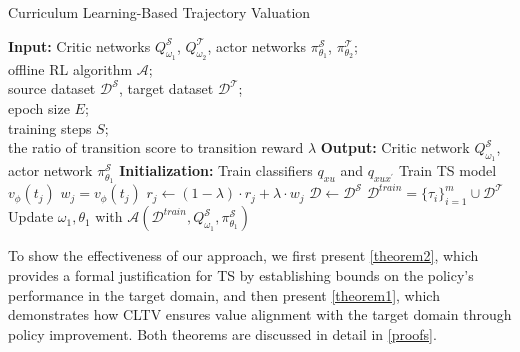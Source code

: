 \begin{algorithm}[!ht]
\caption{Curriculum Learning-Based Trajectory Valuation}
\label{alg:cltv}
\begin{algorithmic}[1]
\State \textbf{Input:} Critic networks $Q_{\omega_1}^{\mathcal{S}}$, $Q_{\omega_2}^{\mathcal{T}}$, actor networks $\pi_{\theta_1}^{\mathcal{S}}$, $\pi_{\theta_2}^{\mathcal{T}}$; \\offline RL algorithm $\mathcal{A}$; \\source dataset $\mathcal{D^S}$, target dataset $\mathcal{D^T}$; \\epoch size $E$; \\training steps $S$; \\the ratio of transition score to transition reward $\lambda$
\State \textbf{Output:} Critic network $Q_{\omega_1}^{\mathcal{S}}$, actor network $\pi_{\theta_1}^{\mathcal{S}}$
\State \textbf{Initialization:}
\State Train classifiers $q_{xu}$ and $q_{xu{x}^{\prime}}$
\State Train TS model $v_{\phi}(t_j)$
    \State $w_j = v_{\phi}(t_j)$
    \State $r_j \leftarrow (1 - \lambda) \cdot r_j + \lambda \cdot w_j$
\EndFor
{}
    \State $\mathcal{D} \leftarrow \mathcal{D^S}$
        \State {}
    \EndFor
        \State $\mathcal{D}^{train} = \{\tau_i\}_{i=1}^m \cup \mathcal{D}^{\mathcal{T}}$
        \State Update $\omega_1, \theta_1$ with $\mathcal{A}(\mathcal{D}^{train}, Q_{\omega_1}^{\mathcal{S}}, \pi_{\theta_1}^{\mathcal{S}})$
    \EndFor
\EndFor
\end{algorithmic}
\end{algorithm}

To show the effectiveness of our approach, we first present \autoref{theorem2}, which provides a formal justification for TS by establishing bounds on the policy's performance in the target domain, and then present \autoref{theorem1}, which demonstrates how CLTV ensures value alignment with the target domain through policy improvement. Both theorems are discussed in detail in \autoref{proofs}.




